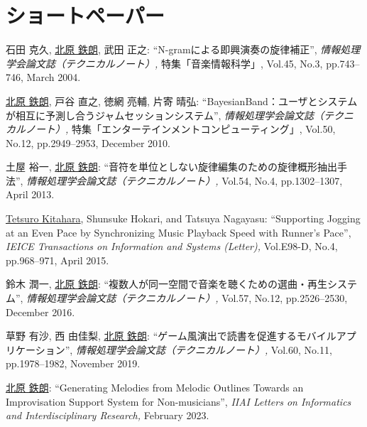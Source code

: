 \section*{ショートペーパー}
\begin{Enumerate}
  
\item 
石田 克久, 
\underline{北原 鉄朗}, 
武田 正之: 
    ``N-gramによる即興演奏の旋律補正'', 
    {\it 情報処理学会論文誌（テクニカルノート）,
    } 特集「音楽情報科学」, Vol.45, No.3, pp.743--746, March 2004. 

\item 
\underline{北原 鉄朗}, 
戸谷 直之, 
徳網 亮輔, 
片寄 晴弘: 
    ``BayesianBand：ユーザとシステムが相互に予測し合うジャムセッションシステム'', 
    {\it 情報処理学会論文誌（テクニカルノート）,
    } 特集「エンターテインメントコンピューティング」, Vol.50, No.12, pp.2949--2953, December 2010. 

\item 
土屋 裕一, 
\underline{北原 鉄朗}: 
    ``音符を単位としない旋律編集のための旋律概形抽出手法'', 
    {\it 情報処理学会論文誌（テクニカルノート）,
    } Vol.54, No.4, pp.1302--1307, April 2013. 

\item 
\underline{Tetsuro Kitahara}, 
Shunsuke Hokari, 
and 
Tatsuya Nagayasu: 
    ``Supporting Jogging at an Even Pace by Synchronizing Music
Playback Speed with Runner's Pace'', 
    {\it IEICE Transactions on Information and Systems (Letter),
    } Vol.E98-D, No.4, pp.968--971, April 2015. 

\item 
鈴木 潤一, 
\underline{北原 鉄朗}: 
    ``複数人が同一空間で音楽を聴くための選曲・再生システム'', 
    {\it 情報処理学会論文誌（テクニカルノート）,
    } Vol.57, No.12, pp.2526--2530, December 2016. 

\item 
草野 有沙, 
西 由佳梨, 
\underline{北原 鉄朗}: 
    ``ゲーム風演出で読書を促進するモバイルアプリケーション'', 
    {\it 情報処理学会論文誌（テクニカルノート）,
    } Vol.60, No.11, pp.1978--1982, November 2019. 

\item 
\underline{北原 鉄朗}: 
    ``Generating Melodies from Melodic Outlines Towards an Improvisation Support System for Non-musicians'', 
    {\it IIAI Letters on Informatics and Interdisciplinary Research,
    } February 2023. 

\end{Enumerate}

